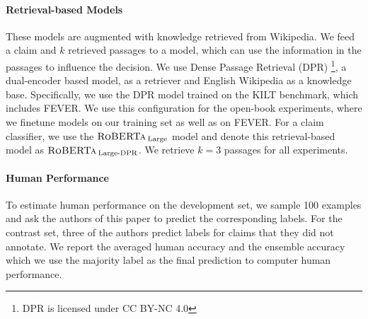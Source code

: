 \paragraph{Retrieval-based Models} These models are augmented with knowledge retrieved from Wikipedia. We feed a claim and $k$ retrieved passages to a model, which can use the information in the passages to influence the decision. We use Dense Passage Retrieval (DPR) \citep{dpr}\footnote{DPR is licensed under CC BY-NC 4.0}, a dual-encoder based model, as a retriever and English Wikipedia as a knowledge base. Specifically, we use the DPR model trained on the KILT benchmark, which includes FEVER. We use this configuration for the open-book experiments, where we finetune models on our training set as well as on FEVER. For a claim classifier, we use the $\textsc{RoBERTa}_{\:\text{Large}}$ model and denote this retrieval-based model as $\textsc{RoBERTa}_{\:\text{Large-DPR}}$. We retrieve $k=3$ passages for all experiments.

\paragraph{Human Performance} To estimate human performance on the development set, we sample 100 examples and ask the authors of this paper to predict the corresponding labels. For the contrast set, three of the authors predict labels for claims that they did not annotate. We report the averaged human accuracy and the ensemble accuracy which we use the majority label as the final prediction to computer human performance. 

